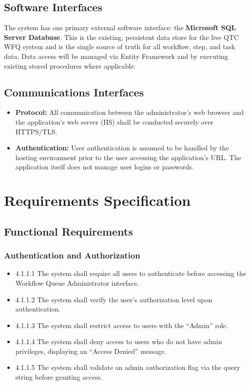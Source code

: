 \documentclass[12pt]{article}
\begin{document}
\subsection{Software Interfaces}
The system has one primary external software interface: the \textbf{Microsoft SQL Server
Database}. This is the existing, persistent data store for the live QTC WFQ system and is the
single source of truth for all workflow, step, and task data. Data access will be managed via
Entity Framework and by executing existing stored procedures where applicable.

\subsection{Communications Interfaces}
\begin{itemize}
    \item \textbf{Protocol:} All communication between the administrator's web browser and the
    application's web server (IIS) shall be conducted securely over HTTPS/TLS.
    \item \textbf{Authentication:} User authentication is assumed to be handled by the hosting
    environment prior to the user accessing the application's URL. The application itself does
    not manage user logins or passwords.
\end{itemize}

\section{Requirements Specification}

\subsection{Functional Requirements}

\subsubsection{Authentication and Authorization}
\begin{itemize}
    \item 4.1.1.1 The system shall require all users to authenticate before accessing the
    Workflow Queue Administrator interface.
    \item 4.1.1.2 The system shall verify the user's authorization level upon authentication.
    \item 4.1.1.3 The system shall restrict access to users with the ``Admin'' role.
    \item 4.1.1.4 The system shall deny access to users who do not have admin privileges,
    displaying an ``Access Denied'' message.
    \item 4.1.1.5 The system shall validate an admin authorization flag via the query string
    before granting access.
\end{itemize}
\end{document}

